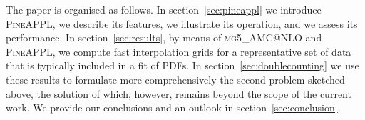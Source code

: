 The paper is organised as follows. In section~\ref{sec:pineappl} we introduce
\textsc{PineAPPL}, we describe its features, we illustrate its operation, and we
assess its performance. In section~\ref{sec:results}, by means of
\textsc{mg5\_AMC@NLO} and \textsc{PineAPPL}, we compute fast interpolation grids for
a representative set of data that is typically included in a fit of PDFs.
In section~\ref{sec:doublecounting} we use these results to formulate more
comprehensively the second problem sketched above, the solution of which, 
however, remains beyond the scope of the current work. We provide our
conclusions and an outlook in section~\ref{sec:conclusion}.

